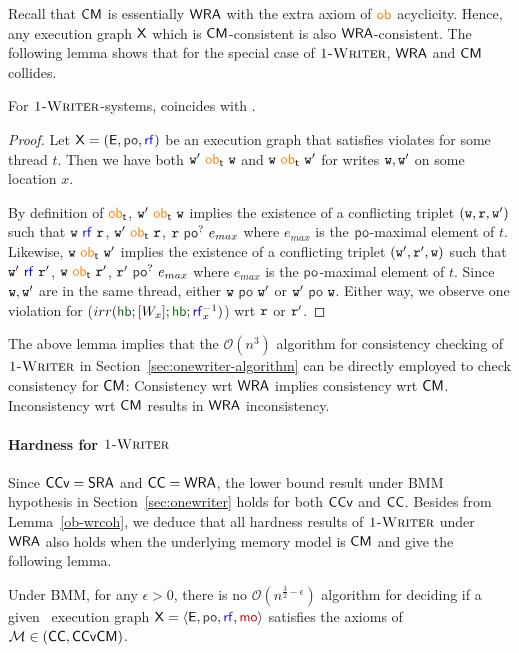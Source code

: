 Recall that $\mathsf{CM}$ is essentially $\mathsf{WRA}$ with the extra axiom of $\ob{}$ acyclicity. Hence, any execution graph $\mathsf{\color{black}X}$  which is $\mathsf{CM}$-consistent is also $\mathsf{WRA}$-consistent. The following lemma  shows that for the special case of $\textsc{1-Writer}$, $\mathsf{WRA}$ and $\mathsf{CM}$ collides. 

\begin{lemma}
For $\textsc{1-Writer}$-systems, \OB{} coincides with \WRCoh{}.
\end{lemma}\label{ob-wrcoh}

\begin{proof}
Let $\ex=(\E,\po,\rf)$ be an execution graph that satisfies \WRCoh{} violates \OB{} for some thread $t$. Then we have both $\wt'~\ob{t}~ \wt$ and  $\wt~\ob{t}~ \wt'$ for writes $\mathtt{w}, \mathtt{w}'$ on some location $x$. 
 
 By definition of $\ob{t}$, $\wt'~\ob{t}~ \wt$ implies the existence of a conflicting triplet $(\mathtt{w}, \mathtt{r}, \mathtt{w}')$ such that 
   $\wt~\rf ~\rd$, $\wt'~\ob{t}~\rd$, $\rd~\po^?~ e_{max}$ where $e_{max}$ is the $\po$-maximal element of $t$.
  Likewise,  $\wt~\ob{t}~ \wt'$ implies the existence of a conflicting triplet $(\mathtt{w}', \mathtt{r}', \mathtt{w})$ such that 
   $\wt'~\rf ~\rd'$, $\wt~\ob{t}~\rd'$, $\rd'~\po^?~ e_{max}$ where $e_{max}$ is the $\po$-maximal element of $t$. 
      Since $\mathtt{w}, \mathtt{w}'$  are in the same thread, either $\wt~\po~\wt'$ or 
   $\wt'~\po~\wt$. Either way, we observe one violation for \WRCoh{} ($irr(\hb;[W_x];\hb;\rf_x^{-1})$) wrt $\mathtt{r}$ or $\mathtt{r}'$.
\end{proof}

The above lemma implies that  the $\mathcal{O}(n^3)$ algorithm for consistency checking of $\textsc{1-Writer}$ in  Section~\ref{sec:onewriter-algorithm} 
can be directly employed to check consistency for $\mathsf{CM}$:  
 Consistency wrt $\mathsf{WRA}$ implies consistency wrt $\mathsf{CM}$. Inconsistency wrt $\mathsf{CM}$ results in $\mathsf{WRA}$ inconsistency. 
   
\paragraph*{Hardness for $\textsc{1-Writer}$} Since $\mathsf{CCv} = \mathsf{SRA}$ and $\mathsf{CC}=\mathsf{WRA}$, the lower bound result under BMM hypothesis in Section~\ref{sec:onewriter} holds for both $\mathsf{CCv}$ and $\mathsf{CC}$. Besides from Lemma~\ref{ob-wrcoh}, we deduce  that all hardness results of $\textsc{1-Writer}$ under $\mathsf{WRA}$ also holds when the underlying memory model is $\mathsf{CM}$ and give the following lemma. 
   
  \begin{lemma}
    \label{lem:cm-onewriter-lowerbound}
Under BMM, for any $\epsilon > 0$, there is no $\mathcal{O}(n^{\frac{3}{2} - \epsilon})$ algorithm for deciding if a given \onewriter\ execution graph $\ex = \tuple{\E, \po, \rf, \mo}$ satisfies the axioms of $\mathcal{M} \in (\mathsf{CC}, \mathsf{CCv}\mathsf{CM})$. 
\end{lemma} 


